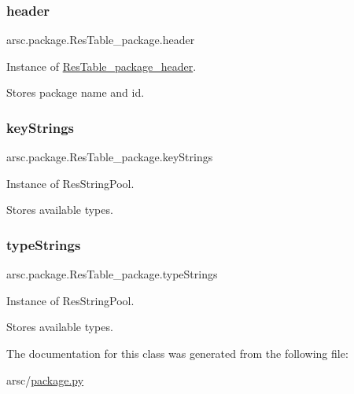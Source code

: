 \subsubsection{\texorpdfstring{header}{header}}
{\footnotesize\ttfamily arsc.\+package.\+Res\+Table\+\_\+package.\+header}



Instance of \mbox{\hyperlink{classarsc_1_1package_1_1ResTable__package__header}{Res\+Table\+\_\+package\+\_\+header}}. 

Stores package name and id. \mbox{\label{classarsc_1_1package_1_1ResTable__package_a6bf9b6aa4bfc9dabb5a494c9f66a2327}} 
\subsubsection{\texorpdfstring{key\+Strings}{keyStrings}}
{\footnotesize\ttfamily arsc.\+package.\+Res\+Table\+\_\+package.\+key\+Strings}



Instance of Res\+String\+Pool. 

Stores available types. \mbox{\label{classarsc_1_1package_1_1ResTable__package_a8e30c278b576f2a0a8ed342fb59e5c15}} 
\subsubsection{\texorpdfstring{type\+Strings}{typeStrings}}
{\footnotesize\ttfamily arsc.\+package.\+Res\+Table\+\_\+package.\+type\+Strings}



Instance of Res\+String\+Pool. 

Stores available types. 

The documentation for this class was generated from the following file\+:\begin{DoxyCompactItemize}
\item 
arsc/\mbox{\hyperlink{package_8py}{package.\+py}}\end{DoxyCompactItemize}
